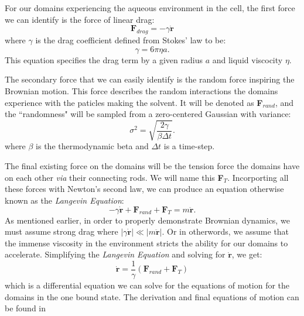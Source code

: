 For our domains experiencing the aqueous environment in the cell, the first force we can identify is the force of linear drag:
\begin{equation}
	\textbf{F}_{drag}=-\gamma \dot{\textbf{r}}
\end{equation}
where $\gamma$ is the drag coefficient defined from Stokes' law to be:
\begin{equation}
	\gamma=6\pi\eta a.
\end{equation}
This equation specifies the drag term by a given radius $a$ and liquid viscocity $\eta$. 

The secondary force that we can easily identify is the random force inspiring the Brownian motion. This force describes the random interactions the domains experience with the paticles making the solvent. It will be denoted as \textbf{F}$_{rand}$, and the ``randomness" will be sampled from a zero-centered Gaussian with variance:
\begin{equation}
	\sigma^2=\sqrt{\frac{2\gamma}{\beta\Delta t}}.
\end{equation}
where $\beta$ is the thermodynamic beta and $\Delta t$ is a time-step. 

The final existing force on the domains will be the tension force the domains have on each other \textit{via} their connecting rods. We will name this \textbf{F}$_T$. Incorporting all these forces with Newton's second law, we can produce an equation otherwise known as the \textit{Langevin Equation}:
\begin{equation}
	-\gamma \dot{\textbf{r}} + \textbf{F}_{rand} + \textbf{F}_T = m\ddot{\textbf{r}}.
\end{equation}
As mentioned earlier, in order to properly demonstrate Brownian dynamics, we must assume strong drag where $|\gamma \dot{\textbf{r}}|\ll |m\ddot{\textbf{r}}|$. Or in otherwords, we assume that the immense viscosity in the environment stricts the ability for our domains to accelerate. Simplifying the \textit{Langevin Equation} and solving for $\dot{\textbf{r}}$, we get:
\begin{equation}
	\dot{\textbf{r}}=\frac{1}{\gamma}(\textbf{F}_{rand} + \textbf{F}_T)
\end{equation}
which is a differential equation we can solve for the equations of motion for the domains in the one bound state. The derivation and final equations of motion can be found in \cite{Capek2017, W}


